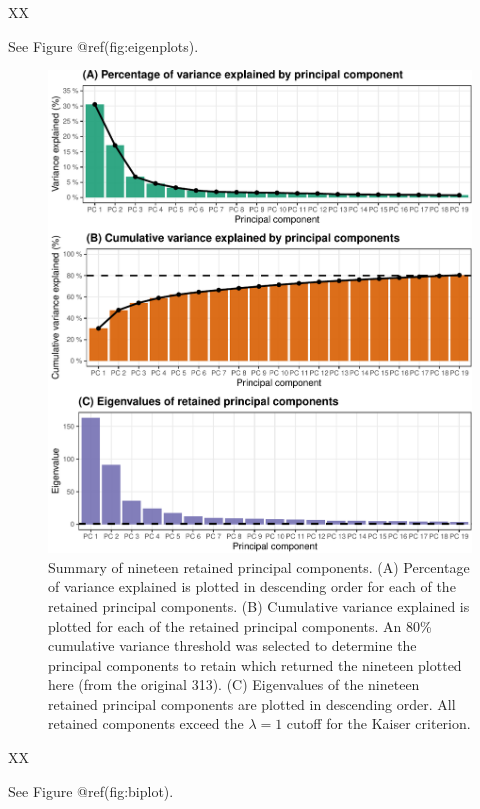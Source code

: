 \documentclass{article}
\begin{document}
XX

See Figure @ref(fig:eigenplots).

\begin{figure}
\centering
\includegraphics{olet5610_report_files/figure-latex/eigenplots-1.pdf}
\caption{Summary of nineteen retained principal components. (A)
Percentage of variance explained is plotted in descending order for each
of the retained principal components. (B) Cumulative variance explained
is plotted for each of the retained principal components. An 80\%
cumulative variance threshold was selected to determine the principal
components to retain which returned the nineteen plotted here (from the
original 313). (C) Eigenvalues of the nineteen retained principal
components are plotted in descending order. All retained components
exceed the \(\lambda = 1\) cutoff for the Kaiser criterion.}
\end{figure}

XX

See Figure @ref(fig:biplot).
\end{document}
